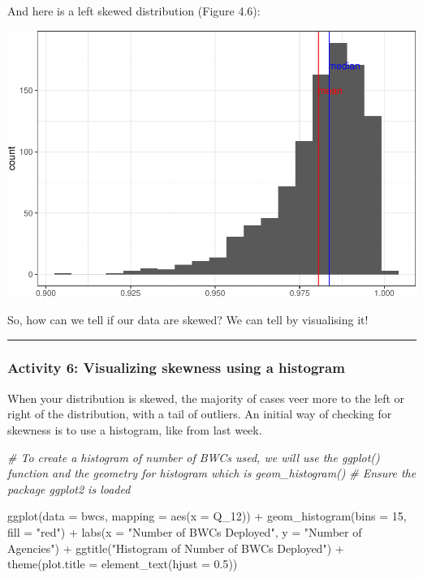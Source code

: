 \documentclass[
]{book}
\newenvironment{Shaded}{\begin{snugshade}}{\end{snugshade}}
\newcommand{\AttributeTok}[1]{\textcolor[rgb]{0.77,0.63,0.00}{#1}}
\newcommand{\CommentTok}[1]{\textcolor[rgb]{0.56,0.35,0.01}{\textit{#1}}}
\newcommand{\DecValTok}[1]{\textcolor[rgb]{0.00,0.00,0.81}{#1}}
\newcommand{\FloatTok}[1]{\textcolor[rgb]{0.00,0.00,0.81}{#1}}
\newcommand{\FunctionTok}[1]{\textcolor[rgb]{0.00,0.00,0.00}{#1}}
\newcommand{\NormalTok}[1]{#1}
\newcommand{\SpecialCharTok}[1]{\textcolor[rgb]{0.00,0.00,0.00}{#1}}
\newcommand{\StringTok}[1]{\textcolor[rgb]{0.31,0.60,0.02}{#1}}
\begin{document}
And here is a left skewed distribution (Figure 4.6):

\includegraphics{04-descriptive-statistics_files/figure-latex/unnamed-chunk-44-1.pdf}

So, how can we tell if our data are skewed? We can tell by visualising it!

\begin{center}\rule{0.5\linewidth}{0.5pt}\end{center}

\hypertarget{activity-6-visualizing-skewness-using-a-histogram}{%
\subsubsection{Activity 6: Visualizing skewness using a histogram}\label{activity-6-visualizing-skewness-using-a-histogram}}

When your distribution is skewed, the majority of cases veer more to the left or right of the distribution, with a tail of outliers. An initial way of checking for skewness is to use a histogram, like from last week.

\begin{Shaded}
\begin{Highlighting}[]
\CommentTok{\# To create a histogram of number of BWCs used, we will use the \textasciigrave{}ggplot()\textasciigrave{} function and the geometry for histogram which is \textasciigrave{}geom\_histogram()\textasciigrave{}}
\CommentTok{\# Ensure the package ggplot2 is loaded}

\FunctionTok{ggplot}\NormalTok{(}\AttributeTok{data =}\NormalTok{ bwcs, }\AttributeTok{mapping =} \FunctionTok{aes}\NormalTok{(}\AttributeTok{x =}\NormalTok{ Q\_12)) }\SpecialCharTok{+} 
  \FunctionTok{geom\_histogram}\NormalTok{(}\AttributeTok{bins =} \DecValTok{15}\NormalTok{, }\AttributeTok{fill =} \StringTok{"red"}\NormalTok{) }\SpecialCharTok{+} 
  \FunctionTok{labs}\NormalTok{(}\AttributeTok{x =} \StringTok{"Number of BWCs Deployed"}\NormalTok{, }\AttributeTok{y =} \StringTok{"Number of Agencies"}\NormalTok{) }\SpecialCharTok{+} 
  \FunctionTok{ggtitle}\NormalTok{(}\StringTok{"Histogram of Number of BWCs Deployed"}\NormalTok{) }\SpecialCharTok{+} 
  \FunctionTok{theme}\NormalTok{(}\AttributeTok{plot.title =} \FunctionTok{element\_text}\NormalTok{(}\AttributeTok{hjust =} \FloatTok{0.5}\NormalTok{)) }
\end{Highlighting}
\end{Shaded}
\end{document}
